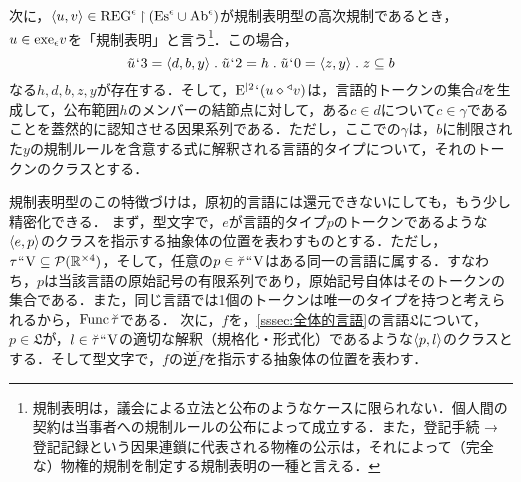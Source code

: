 次に，$ \langle u,v \rangle\in\mathrm{REG}^\epsilon\mathbin{\upharpoonright}(\mathrm{Es}^\epsilon\cup\mathrm{Ab}^\epsilon) $が規制表明型の高次規制であるとき，$ u\in\mathrm{exe}_{\epsilon} v $を「規制表明」と言う\footnote{
    規制表明は，議会による立法と公布のようなケースに限られない．個人間の契約は当事者への規制ルールの公布によって成立する．また，登記手続 → 登記記録という因果連鎖に代表される物権の公示は，それによって（完全な）物権的規制を制定する規制表明の一種と言える．
}．この場合，
\[
    \tilde{u}\fap 3 = \orp{d,b,y}\con{1}\tilde{u}\fap 2 = h\con{1}
    \tilde{u}\fap 0=\orp{z,y}\con{1}z\subseteq b
\]
なる$ h,d,b,z,y $が存在する．そして，$ \mathrm{E}^{\mid 2}{\mspace{1mu}{`}\mspace{1mu}}(u\diamond{^\triangleleft}v) $は，言語的トークンの集合$d$を生成して，公布範囲$h$のメンバーの結節点に対して，ある$c\in d$について$c \in \gamma$であることを蓋然的に認知させる因果系列である．ただし，ここでの$\gamma$は，$b$に制限された$y$の規制ルールを含意する式に解釈される言語的タイプについて，それのトークンのクラスとする．

規制表明型のこの特徴づけは，原初的言語には還元できないにしても，もう少し精密化できる．
まず，型文字\kagi{$ \tau $}で，$e$が言語的タイプ$p$のトークンであるような$ \langle e,p \rangle $のクラスを指示する抽象体の位置を表わすものとする．ただし，$ \tau{\mspace{1mu}{``}\mspace{1mu}}\mathrm{V}\subseteq \mathcal{P}(\mathbb{R}^{\times 4}) $，そして，任意の$ p\in \breve{\tau}{\mspace{1mu}{``}\mspace{1mu}}\mathrm{V} $はある同一の言語に属する．すなわち，$p$は当該言語の原始記号の有限系列であり，原始記号自体はそのトークンの集合である．また，同じ言語では1個のトークンは唯一のタイプを持つと考えられるから，$ \operatorname{Func}\breve{\tau} $である．
次に，$ f $を，\ref{sssec:全体的言語}の言語$\mathfrak{L}$について，$p\in\mathfrak{L}$が，$ l\in\breve{\tau}{\mspace{1mu}{``}\mspace{1mu}}\mathrm{V} $の適切な解釈（規格化・形式化）であるような$\langle p,l \rangle$のクラスとする．そして型文字\kagi{$ \theta $}で，$ f $の逆$\breve{f}$を指示する抽象体の位置を表わす．

